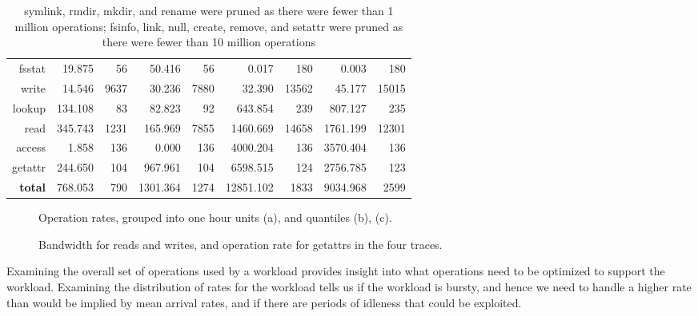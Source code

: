 \begin{table*}
\begin{tabular}{|r||r|r||r|r||r|r||r|r|}
      fsstat &    19.875 &    56 &    50.416 &    56 &     0.017 &   180 &     0.003 &   180 \\
       write &    14.546 &  9637 &    30.236 &  7880 &    32.390 & 13562 &    45.177 & 15015 \\
\hline
      lookup &   134.108 &    83 &    82.823 &    92 &   643.854 &   239 &   807.127 &   235 \\
        read &   345.743 &  1231 &   165.969 &  7855 &  1460.669 & 14658 &  1761.199 & 12301 \\
      access &     1.858 &   136 &     0.000 &   136 &  4000.204 &   136 &  3570.404 &   136 \\
     getattr &   244.650 &   104 &   967.961 &   104 &  6598.515 &   124 &  2756.785 &   123 \\
\hline
 {\bf total} &   768.053 &   790 &  1301.364 &  1274 & 12851.102 &  1833 &  9034.968 &  2599 \\
\hline
\end{tabular}

\caption{symlink, rmdir, mkdir, and rename were pruned as there were
fewer than 1 million operations; fsinfo, link, null, create, remove,
and setattr were pruned as there were fewer than 10 million
operations}

\label{table:nfs-stats-overview}
\end{table*}

\begin{figure*}
\caption{Operation rates, grouped into one hour units (a), and quantiles (b), (c).}
\label{fig:oprates}
\end{figure*}

\begin{figure*}
\caption{Bandwidth for reads and writes, and operation rate for getattrs in the four traces.}
\label{fig:bw-ops-quantiles}
\end{figure*}

Examining the overall set of operations used by a workload provides
insight into what operations need to be optimized to support the
workload.  Examining the distribution of rates for the workload tells
us if the workload is bursty, and hence we need to handle a higher
rate than would be implied by mean arrival rates, and if there are
periods of idleness that could be exploited.

